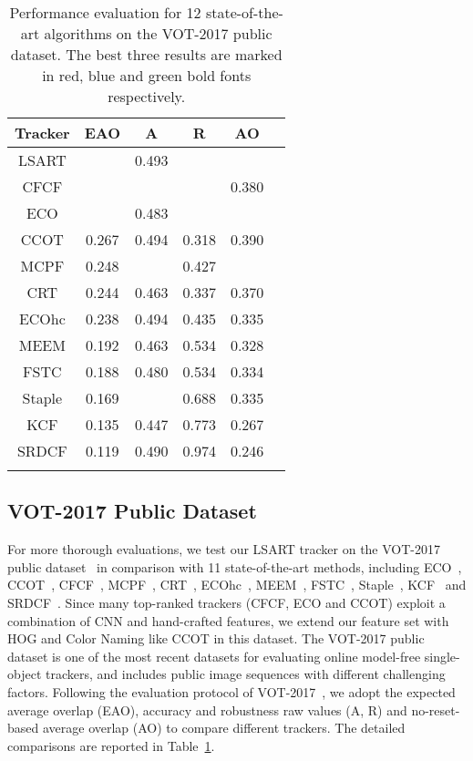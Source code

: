 \documentclass[10pt,twocolumn,letterpaper]{article}
\begin{document}
\begin{table}[hht]
\caption{Performance evaluation for 12 state-of-the-art algorithms on the VOT-2017 public dataset.
The best three results are marked in red, blue and green bold fonts respectively.}
\label{tab:table1}
\small
\begin{center}
\label{tab1}
\begin{tabular}{cccccc}
\hline
Tracker&EAO&A&R&AO
\\
\hline
\hline
LSART&\color{red}{\bf 0.323}&0.493&\color{red}{\bf 0.218}&\color{blue}{\bf 0.437}\\
CFCF&\color{blue}{\bf 0.286}&\color{green}{\bf 0.509}&\color{green}{\bf 0.281}&0.380\\
ECO&\color{green}{\bf 0.280}&0.483&\color{blue}{\bf 0.276}&\color{green}{\bf 0.402}\\
CCOT&0.267&0.494&0.318&0.390\\
MCPF&0.248&\color{blue}{\bf 0.510}&0.427&\color{red}{\bf 0.443}\\
CRT&0.244&0.463&0.337&0.370\\
ECOhc&0.238&0.494&0.435&0.335\\
MEEM&0.192&0.463&0.534&0.328\\
FSTC&0.188&0.480&0.534&0.334\\
Staple&0.169&\color{red}{\bf 0.530}&0.688&0.335\\
KCF&0.135&0.447&0.773&0.267\\
SRDCF&0.119&0.490&0.974&0.246&\\
\hline
\vspace{-4mm}
\label{tab:vot-2017}
\end{tabular}
\end{center}
\end{table}

\vspace{-0mm}
\subsection{VOT-2017 Public Dataset}
For more thorough evaluations, we test our LSART tracker on the VOT-2017 public dataset~\cite{VOT2017}
in comparison with 11 state-of-the-art methods, including ECO~\cite{danelljan2016eco},
CCOT~\cite{danelljan2016beyond}, CFCF~\cite{gundogdu2017good}, MCPF~\cite{zhang2017multi},
CRT~\cite{chen2016convolutional}, ECOhc~\cite{danelljan2016eco}, MEEM~\cite{zhang2014meem},
FSTC~\cite{wang2015visual}, Staple~\cite{bertinetto2016staple}, KCF~\cite{henriques2015high}
and SRDCF~\cite{danelljan2015learning}.
Since many top-ranked trackers (\eg CFCF, ECO and CCOT) exploit a combination of CNN and hand-crafted features,
we extend our feature set with HOG and Color Naming like CCOT in this dataset.
The VOT-2017 public dataset is one of the most recent datasets for evaluating online model-free single-object trackers,
and includes  public image sequences with different challenging factors.
Following the evaluation protocol of VOT-2017~\cite{VOT2017}, we adopt the expected average
overlap (EAO), accuracy and robustness raw values (A, R) and no-reset-based average overlap
(AO) to compare different trackers.
The detailed comparisons are reported in Table~\ref{tab:vot-2017}.
\end{document}
